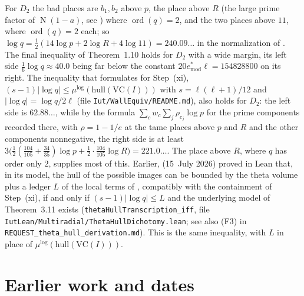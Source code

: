\documentclass[11pt]{amsart}
\theoremstyle{remark}
\newcommand{\mulog}{\mu^{\log}}
\newcommand{\Nm}{\operatorname{N}}
\begin{document}
For $D_2$ the bad places are $b_1,b_2$ above $p$, the place above $R$ (the large prime factor of $\Nm(1-a)$, see
\cite[Prop.~2]{Note}) where $\operatorname{ord}(q)=2$, and the two places above $11$, where $\operatorname{ord}(q)=2$
each; so $\log q=\tfrac12(14\log p+2\log R+4\log11)=240.09\ldots$ in the normalization of \cite[Thm.~1.10]{IUT4}. The
final inequality of Theorem~1.10 holds for $D_2$ with a wide margin, its left side $\tfrac16\log q\approx40.0$ being
far below the constant $20e^*_{\mathrm{mod}}\ell=154828800$ on its right. The inequality that \cite{LANAiut}
formulates for Step~(xi), $(s-1)|\log q|\le\mulog(\mathrm{hull}(\mathrm{VC}(I)))$ with $s=\ell(\ell+1)/12$ and
$|\log q|=\log q/2\ell$ (file \nolinkurl{Iut/WallEquiv/README.md}), also holds for $D_2$: the left side is $62.88\ldots$,
while by the formula $\sum_c w_c\sum_j\rho_{c_j}\log p$ for the prime components recorded there, with
$\rho=1-1/e$ at the tame places above $p$ and $R$ and the other components nonnegative, the right side is at least
$3\bigl(\tfrac12(\tfrac{104}{105}+\tfrac{34}{35})\log p+\tfrac12\cdot\tfrac{104}{105}\log R\bigr)=221.0\ldots$.
The place above $R$, where $q$ has order only $2$, supplies most of this. Earlier, \cite{Takkun} (15~July 2026)
proved in Lean that, in its model, the hull of the possible images can be bounded by the theta volume plus a ledger
$L$ of the local terms of \cite[Props.~1.1--1.4]{IUT4}, compatibly with the containment of Step~(xi), if and only if
$(s-1)|\log q|\le L$ and the underlying model of Theorem~3.11 exists (\nolinkurl{thetaHullTranscription_iff}, file
\nolinkurl{IutLean/Multiradial/ThetaHullDichotomy.lean}; see also (F3) in
\nolinkurl{REQUEST_theta_hull_derivation.md}). This is the same inequality, with $L$ in place of
$\mulog(\mathrm{hull}(\mathrm{VC}(I)))$.

\section{Earlier work and dates}\label{s:prior}
\end{document}
